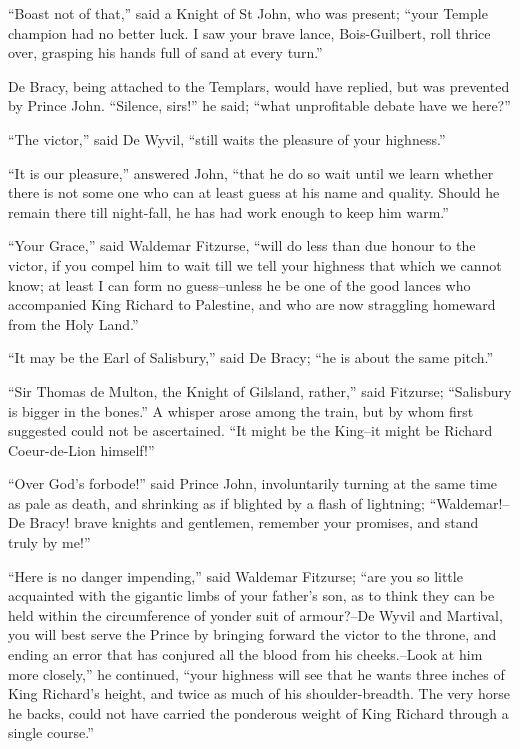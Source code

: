 ``Boast not of that,'' said a Knight of St John, who was present; ``your
Temple champion had no better luck. I saw your brave lance,
Bois-Guilbert, roll thrice over, grasping his hands full of sand at
every turn.''

De Bracy, being attached to the Templars, would have replied, but was
prevented by Prince John. ``Silence, sirs!'' he said; ``what
unprofitable debate have we here?''

``The victor,'' said De Wyvil, ``still waits the pleasure of your
highness.''

``It is our pleasure,'' answered John, ``that he do so wait until we
learn whether there is not some one who can at least guess at his name
and quality. Should he remain there till night-fall, he has had work
enough to keep him warm.''

``Your Grace,'' said Waldemar Fitzurse, ``will do less than due honour
to the victor, if you compel him to wait till we tell your highness that
which we cannot know; at least I can form no guess--unless he be one of
the good lances who accompanied King Richard to Palestine, and who are
now straggling homeward from the Holy Land.''

``It may be the Earl of Salisbury,'' said De Bracy; ``he is about the
same pitch.''

``Sir Thomas de Multon, the Knight of Gilsland, rather,'' said Fitzurse;
``Salisbury is bigger in the bones.'' A whisper arose among the train,
but by whom first suggested could not be ascertained. ``It might be the
King--it might be Richard Coeur-de-Lion himself!''

``Over God's forbode!'' said Prince John, involuntarily turning at the
same time as pale as death, and shrinking as if blighted by a flash of
lightning; ``Waldemar!--De Bracy! brave knights and gentlemen, remember
your promises, and stand truly by me!''

``Here is no danger impending,'' said Waldemar Fitzurse; ``are you so
little acquainted with the gigantic limbs of your father's son, as to
think they can be held within the circumference of yonder suit of
armour?--De Wyvil and Martival, you will best serve the Prince by
bringing forward the victor to the throne, and ending an error that has
conjured all the blood from his cheeks.--Look at him more closely,'' he
continued, ``your highness will see that he wants three inches of King
Richard's height, and twice as much of his shoulder-breadth. The very
horse he backs, could not have carried the ponderous weight of King
Richard through a single course.''

